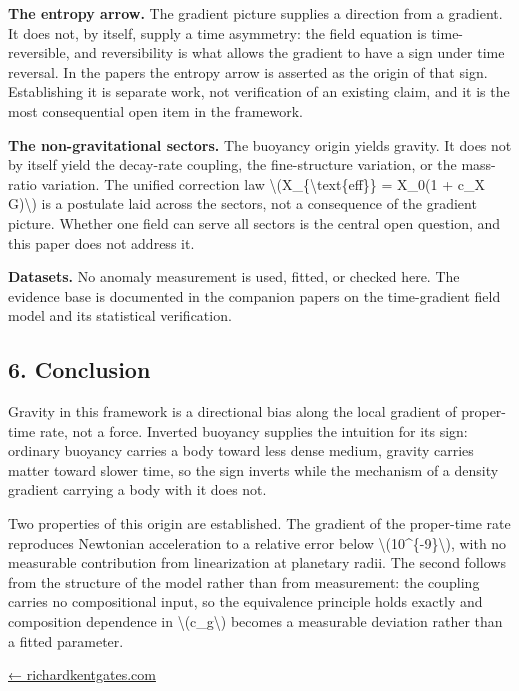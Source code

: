 \documentclass[
  10pt,
]{article}
\begin{document}
\textbf{The entropy arrow.} The gradient picture supplies a direction
from a gradient. It does not, by itself, supply a time asymmetry: the
field equation is time-reversible, and reversibility is what allows the
gradient to have a sign under time reversal. In the papers the entropy
arrow is asserted as the origin of that sign. Establishing it is
separate work, not verification of an existing claim, and it is the most
consequential open item in the framework.

\textbf{The non-gravitational sectors.} The buoyancy origin yields
gravity. It does not by itself yield the decay-rate coupling, the
fine-structure variation, or the mass-ratio variation. The unified
correction law \textbackslash(X\_\{\textbackslash text\{eff\}\} = X\_0(1
+ c\_X G)\textbackslash) is a postulate laid across the sectors, not a
consequence of the gradient picture. Whether one field can serve all
sectors is the central open question, and this paper does not address
it.

\textbf{Datasets.} No anomaly measurement is used, fitted, or checked
here. The evidence base is documented in the companion papers on the
time-gradient field model and its statistical verification.

\hypertarget{conclusion}{%
\subsection{6. Conclusion}\label{conclusion}}

Gravity in this framework is a directional bias along the local gradient
of proper-time rate, not a force. Inverted buoyancy supplies the
intuition for its sign: ordinary buoyancy carries a body toward less
dense medium, gravity carries matter toward slower time, so the sign
inverts while the mechanism of a density gradient carrying a body with
it does not.

Two properties of this origin are established. The gradient of the
proper-time rate reproduces Newtonian acceleration to a relative error
below \textbackslash(10\^{}\{-9\}\textbackslash), with no measurable
contribution from linearization at planetary radii. The second follows
from the structure of the model rather than from measurement: the
coupling carries no compositional input, so the equivalence principle
holds exactly and composition dependence in
\textbackslash(c\_g\textbackslash) becomes a measurable deviation rather
than a fitted parameter.

\href{https://richardkentgates.com/}{← richardkentgates.com}
\end{document}
